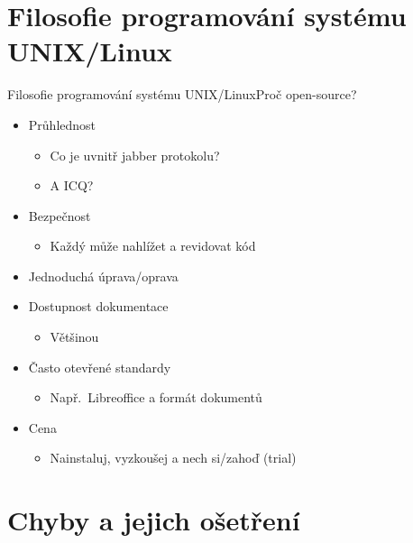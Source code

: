 \section{Filosofie programování systému UNIX/Linux}
\frame{\sectionpage}

\begin{frame}{Filosofie programování systému UNIX/Linux}{Proč open-source?}

  \begin{itemize}[<+->]
    \item Průhlednost
    \begin{itemize}
      \item Co je uvnitř jabber protokolu?

      \pause

      \item A ICQ?
    \end{itemize}

    \item Bezpečnost
    \begin{itemize}
      \item Každý může nahlížet a revidovat kód
    \end{itemize}

    \item Jednoduchá úprava/oprava

    \item Dostupnost dokumentace
    \begin{itemize}
      \item Většinou
    \end{itemize}

    \item Často otevřené standardy
    \begin{itemize}
      \item Např.\ Libreoffice a formát dokumentů
    \end{itemize}

    \item Cena
    \begin{itemize}
      \item Nainstaluj, vyzkoušej a nech si/zahoď (trial)
    \end{itemize}

  \end{itemize}

\end{frame}

\section{Chyby a jejich ošetření}
\frame{\sectionpage}

